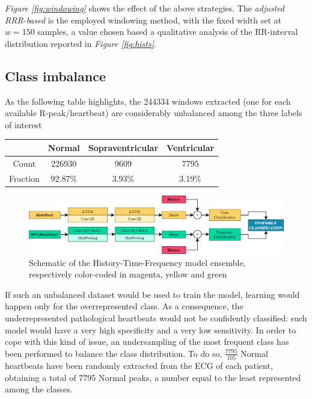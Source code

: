 \documentclass[conference]{IEEEtran}
\newcommand{\fig}[1]{\textit{Figure \ref{#1}}}
\begin{document}
    \fig{fig:windowing} shows the effect of the above strategies. The
    \textit{adjusted RRR-based} is the employed windowing method, with the
    fixed width set at $w = 150$ samples, a value chosen based a qualitative
    analysis of the RR-interval distribution reported in \fig{fig:hists}.

\subsection{Class imbalance}
    As the following table highlights, the 244334 windows extracted 
    (one for each available R-peak/heartbeat) are
    considerably unbalanced among the three labels of interest
    \begin{center}
        \begin{tabular}{||c |c c c||}
            \hline
            & Normal & Sopraventricular & Ventricular \\
            \hline \hline
            Count & 226930 & 9609 & 7795 \\
            \hline
            Fraction & 92.87\% & 3.93\% & 3.19\% \\
            \hline
        \end{tabular}
    \end{center}

    
    \begin{figure}
        \centering
        \includegraphics{img/model.png}
        \caption{Schematic of the History-Time-Frequency model ensemble,
        respectively color-coded in magenta, yellow and green}
        \label{fig:model}
    \end{figure}

    If such an unbalanced dataset would be used to train the model, learning
    would happen only for the overrepresented class. As a consequence, the 
    underrepresented pathological heartbeats would not be confidently
    classified: such model would have a very high specificity and a very low
    sensitivity. In order to cope with this kind of issue, an undersampling of
    the most frequent class has been performed to balance the class
    distribution. To do so, $\frac{7795}{105}$ Normal heartbeats have been
    randomly extracted from the ECG of each patient, obtaining a total of 7795
    Normal peaks,
    a number equal to the least represented among the classes.
\end{document}
